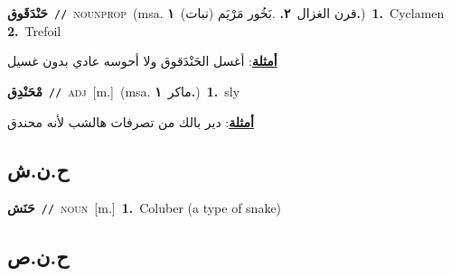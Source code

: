 \documentclass[10pt,a4paper,twoside]{article} %
\begin{document}
\begin{multicols}{2}
{\setlength\topsep{0pt}\textbf{\foreignlanguage{arabic}{حَنْدَقَوق}}\ {\color{gray}\texttt{//}\color{black}}\ \textsc{noun\textunderscore prop}\ \color{gray}(msa. \foreignlanguage{arabic}{قرن الغزال}~\foreignlanguage{arabic}{\textbf{٢.}}  .\foreignlanguage{arabic}{بَخُور مَرْيَم (نبات)}~\foreignlanguage{arabic}{\textbf{١.}})\color{black}\ \textbf{1.}~Cyclamen  \textbf{2.}~Trefoil\  \begin{flushright}\color{gray}\foreignlanguage{arabic}{\textbf{\underline{\foreignlanguage{arabic}{أمثلة}}}: أغسل الحَنْدَقوق ولا أحوسه عادي بدون غسيل}\end{flushright}\color{black}} \vspace{2mm}

{\setlength\topsep{0pt}\textbf{\foreignlanguage{arabic}{مْحَنْدِق}}\ {\color{gray}\texttt{//}\color{black}}\ \textsc{adj}\ [m.]\ \color{gray}(msa. \foreignlanguage{arabic}{ماكر}~\foreignlanguage{arabic}{\textbf{١.}})\color{black}\ \textbf{1.}~sly\  \begin{flushright}\color{gray}\foreignlanguage{arabic}{\textbf{\underline{\foreignlanguage{arabic}{أمثلة}}}: دير بالك من تصرفات هالشب لأنه محندق}\end{flushright}\color{black}} \vspace{2mm}

\vspace{-3mm}
\subsection*{\color{blue}\foreignlanguage{arabic}{ح.ن.ش}\color{blue}{}} 

{\setlength\topsep{0pt}\textbf{\foreignlanguage{arabic}{حَنَش}}\ {\color{gray}\texttt{//}\color{black}}\ \textsc{noun}\ [m.]\ \textbf{1.}~Coluber (a type of snake)\ } \vspace{2mm}

\vspace{-3mm}
\subsection*{\color{blue}\foreignlanguage{arabic}{ح.ن.ص}\color{blue}{}} 


\end{multicols}
\end{document}
